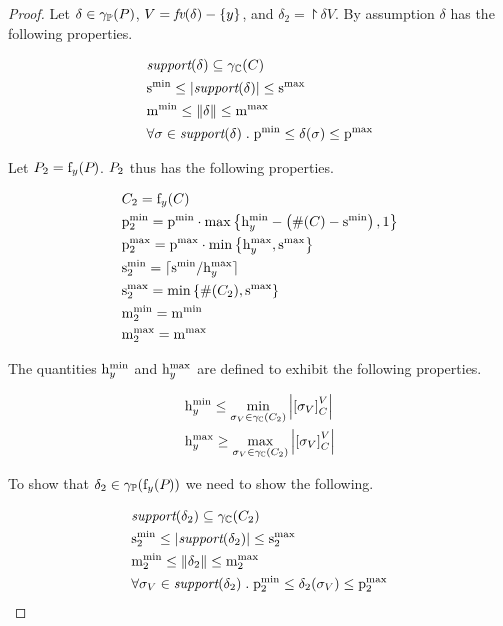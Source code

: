 \begin{proof} Let $ \delta \in \gamma_{\mathbb{P}}(P) $, $ V = \textit{fv}(\delta)
- \left\{ y \right\} $, and $ \delta_2 = \project{\delta}{V}$. By assumption
  $ \delta $ has the following properties.

\begin{align}
\label{thm:pp:forget:given1a} & \support{\delta} \subseteq \pconc{C} \\
\label{thm:pp:forget:given2a}& \smin{} \leq \setsize{\support{\delta}} \leq \smax{} \\
\label{thm:pp:forget:given3a}& \mmin{} \leq \pmass{\delta} \leq \mmax{} \\
\label{thm:pp:forget:given4a}& \forall \sigma \in \support{\delta} \;
. \; \pmin{} \leq \delta(\sigma) \leq \pmax{}
\end{align}

Let $ P_{2} = \mathrm{f}_{y}(P_{}) $. $ P_{2} $ thus has the following
properties.

\begin{align}
& C_{2} = \mathrm{f}_{y}(C) \\
& \mathrm{p}^\mathrm{min}_{2} = \mathrm{p}^\mathrm{min}_{} \cdot \max\left\{ \mathrm{h}^\mathrm{min}_{y} - \left( \#(C)
- \mathrm{s}^\mathrm{min}_{} \right), 1 \right\} \\
& \mathrm{p}^\mathrm{max}_{2} = \mathrm{p}^\mathrm{max}_{} \cdot \min\left\{ \mathrm{h}^\mathrm{max}_{y}, \mathrm{s}^\mathrm{max}_{} \right\} \\
& \mathrm{s}^\mathrm{min}_{2} = \lceil \mathrm{s}^\mathrm{min}_{} / \mathrm{h}^\mathrm{max}_{y} \rceil \\
& \mathrm{s}^\mathrm{max}_{2} = \min\left\{ \#(C_{2}), \mathrm{s}^\mathrm{max}_{} \right\} \\
& \mathrm{m}^\mathrm{min}_{2} = \mathrm{m}^\mathrm{min}_{} \\
& \mathrm{m}^\mathrm{max}_{2} = \mathrm{m}^\mathrm{max}_{}
\end{align}

The quantities $ \mathrm{h}^\mathrm{min}_{y} $ and $ \mathrm{h}^\mathrm{max}_{y} $ are defined to exhibit
the following properties.

\begin{align}
\label{thm:pp:forget:given1b} & \minh{y} \leq \min_{\sigma_V \in \pconc{\getpoly{2}}} \setsize{\eqclass{\sigma_V}{C}{V}} \\
\label{thm:pp:forget:given2b} & \maxh{y} \geq \max_{\sigma_V \in \pconc{\getpoly{2}}} \setsize{\eqclass{\sigma_V}{C}{V}}
\end{align}

To show that $ \delta_2 \in \gamma_{\mathbb{P}}(\mathrm{f}_{y}(P_{})) $ we need to show the following.

\begin{align}
\label{thm:pp:forget:cond1} & \support{\delta_2} \subseteq \pconc{\getpoly{2}} \\
\label{thm:pp:forget:cond2} & \smin{2} \leq \setsize{\support{\delta_2}} \leq \smax{2} \\
\label{thm:pp:forget:cond3} & \mmin{2} \leq \pmass{\delta_2} \leq \mmax{2} \\
\label{thm:pp:forget:cond4} & \forall \sigma_V \in \support{\delta_2} \qsep \pmin{2} \leq \delta_2(\sigma_V) \leq \pmax{2}
\end{align}


\end{proof}

